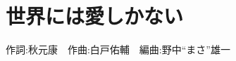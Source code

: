 \section{世界には愛しかない}

\begin{center}
    \scriptsize{
        作詞:秋元康　作曲:白戸佑輔　編曲:野中“まさ”雄一
    }
\end{center}

\vspace{0.7em}

\begin{Parallel}[c]{0.47\textwidth}{0.47\textwidth}

\ParallelLText{
    \footnotesize{
        
    }
}

\ParallelRText{
    \footnotesize{
        
    }
}

\end{Parallel}
